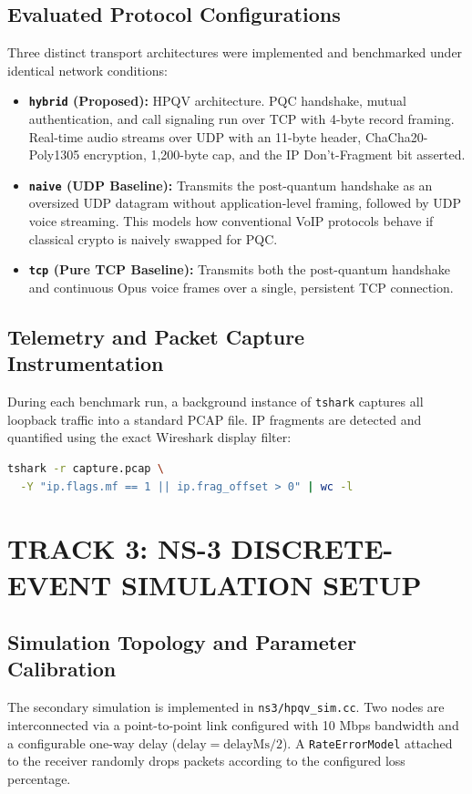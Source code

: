 \subsection{Evaluated Protocol Configurations}
Three distinct transport architectures were implemented and benchmarked under identical network conditions:
\begin{itemize}
    \item \textbf{\texttt{hybrid} (Proposed):} HPQV architecture. PQC handshake, mutual authentication, and call signaling run over TCP with 4-byte record framing. Real-time audio streams over UDP with an 11-byte header, ChaCha20-Poly1305 encryption, 1,200-byte cap, and the IP Don't-Fragment bit asserted.
    \item \textbf{\texttt{naive} (UDP Baseline):} Transmits the post-quantum handshake as an oversized UDP datagram without application-level framing, followed by UDP voice streaming. This models how conventional VoIP protocols behave if classical crypto is naively swapped for PQC.
    \item \textbf{\texttt{tcp} (Pure TCP Baseline):} Transmits both the post-quantum handshake and continuous Opus voice frames over a single, persistent TCP connection.
\end{itemize}

\subsection{Telemetry and Packet Capture Instrumentation}
During each benchmark run, a background instance of \texttt{tshark} captures all loopback traffic into a standard PCAP file. IP fragments are detected and quantified using the exact Wireshark display filter:
\begin{lstlisting}[language=bash]
tshark -r capture.pcap \
  -Y "ip.flags.mf == 1 || ip.frag_offset > 0" | wc -l
\end{lstlisting}

\section{TRACK 3: NS-3 DISCRETE-EVENT SIMULATION SETUP}

\subsection{Simulation Topology and Parameter Calibration}
The secondary simulation is implemented in \texttt{ns3/hpqv\_sim.cc}. Two nodes are interconnected via a point-to-point link configured with 10 Mbps bandwidth and a configurable one-way delay ($\text{delay} = \text{delayMs}/2$). A \texttt{RateErrorModel} attached to the receiver randomly drops packets according to the configured loss percentage.

